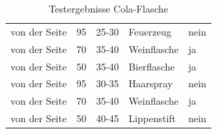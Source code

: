 \begin{table} [H]
\begin{tabular} {l l l l l}
von der Seite&	95&	25-30&	Feuerzeug\cellcolor{red}&nein\cellcolor{red}\\
von der Seite&	70&	35-40&	Weinflasche\cellcolor{red}&ja\cellcolor{green}\\
von der Seite&	50&	35-40&	Bierflasche\cellcolor{red}&ja\cellcolor{green}\\
von der Seite&	95&	30-35&	Haarspray\cellcolor{red}&nein\cellcolor{red}\\
von der Seite&	70&	35-40&	Weinflasche\cellcolor{red}&ja\cellcolor{green}\\
von der Seite&	50&	40-45&	Lippenstift\cellcolor{red}&nein\cellcolor{red}\\
		\end{tabular}
\caption{Testergebnisse Cola-Flasche}
\label{Cola}
\end{table}

